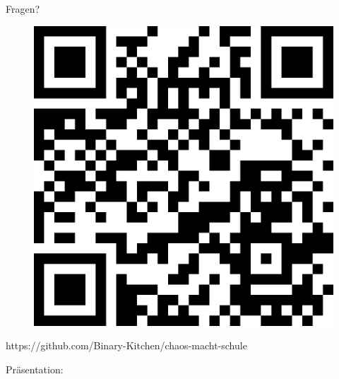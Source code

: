 \documentclass[10pt]{beamer}
\begin{document}
%
%
{
\begin{frame}[standout]
  Fragen?
  	\begin{figure}
		\includegraphics[width=.3\textwidth]{images/qrcode}
	\end{figure}
  \tiny https://github.com/Binary-Kitchen/chaos-macht-schule
  
  Präsentation:
  \ccbysa
\end{frame}
}
\end{document}
